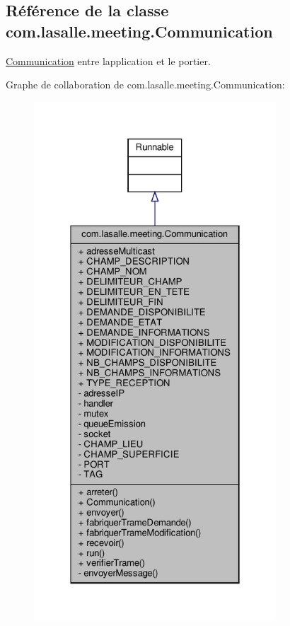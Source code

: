 \hypertarget{classcom_1_1lasalle_1_1meeting_1_1_communication}{}\subsection{Référence de la classe com.\+lasalle.\+meeting.\+Communication}
\label{classcom_1_1lasalle_1_1meeting_1_1_communication}


\hyperlink{classcom_1_1lasalle_1_1meeting_1_1_communication}{Communication} entre l\textquotesingle{}application et le portier.  




Graphe de collaboration de com.\+lasalle.\+meeting.\+Communication\+:\nopagebreak
\begin{figure}[H]
\begin{center}
\leavevmode
\includegraphics[height=550pt]{classcom_1_1lasalle_1_1meeting_1_1_communication__coll__graph}
\end{center}
\end{figure}

